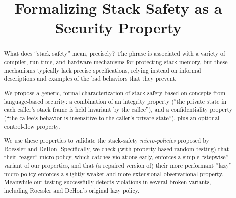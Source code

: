 \documentclass[10pt,conference]{ieeetran}%
\theoremstyle{definition}
\begin{document}
\title{Formalizing Stack Safety as a Security Property}




\ifcameraready
{}  %
\fi

\maketitle

\begin{abstract}

What does ``stack safety'' mean, precisely? The phrase is associated with a
variety of compiler,
run-time, and hardware mechanisms for protecting stack
memory, but these mechanisms typically lack precise specifications,
relying instead on informal descriptions and examples of the bad
behaviors that they prevent.

We propose a generic, formal characterization
of stack safety based on concepts from language-based security: a
combination of an integrity property (``the private
state in each caller's stack frame is held invariant by the callee''),
and a confidentiality property (``the callee's behavior is insensitive to the
caller's private state''), plus an optional control-flow property.

We use these properties to validate the stack-safety {\em micro-policies}
proposed by Roessler and DeHon. %
Specifically, we check (with
property-based random testing) that their ``eager''
micro-policy, which catches violations early, enforces a
simple ``stepwise'' variant of our properties, and that
(a repaired version of) their more performant
``lazy'' micro-policy enforces a slightly weaker and more extensional
observational property. Meanwhile our testing successfully detects violations
in several broken variants, including Roessler and DeHon's original lazy policy.

\end{abstract}
\end{document}
